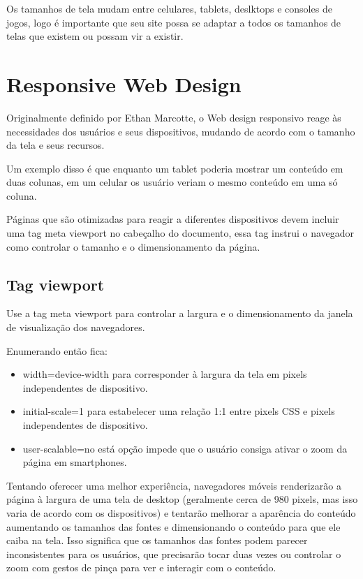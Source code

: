 \documentclass[12pt,a4paper]{article}
\begin{document}
Os tamanhos de tela mudam entre celulares, tablets, deslktops e consoles de jogos, logo é importante que seu site possa se adaptar a todos os tamanhos de telas que existem ou possam vir a existir.

\section{Responsive Web Design}
Originalmente definido por Ethan Marcotte, o Web design responsivo reage às necessidades dos usuários e seus dispositivos, mudando de acordo com o tamanho da tela e seus recursos.

Um exemplo disso é que enquanto um tablet poderia mostrar um conteúdo em duas colunas, em um celular os usuário veriam o mesmo conteúdo em uma só coluna.

Páginas que são otimizadas para reagir a diferentes dispositivos devem incluir uma tag meta viewport no cabeçalho do documento, essa tag instrui o navegador como controlar o tamanho e o dimensionamento da página.

\subsection{Tag viewport} 


Use a tag meta viewport para controlar a largura e o dimensionamento da janela de visualização dos navegadores.

Enumerando então fica:
\begin{itemize}
\item width=device-width para corresponder à largura da tela em pixels independentes de dispositivo.

\item initial-scale=1 para estabelecer uma relação 1:1 entre pixels CSS e pixels independentes de dispositivo.

\item user-scalable=no está opção impede que o usuário consiga ativar o zoom da página em smartphones. 
\end{itemize}

Tentando oferecer uma melhor experiência, navegadores móveis renderizarão a página à largura de uma tela de desktop (geralmente cerca de 980 pixels, mas isso varia de acordo com os dispositivos) e tentarão melhorar a aparência do conteúdo aumentando os tamanhos das fontes e dimensionando o conteúdo para que ele caiba na tela. Isso significa que os tamanhos das fontes podem parecer inconsistentes para os usuários, que precisarão tocar duas vezes ou controlar o zoom com gestos de pinça para ver e interagir com o conteúdo.
\end{document}
